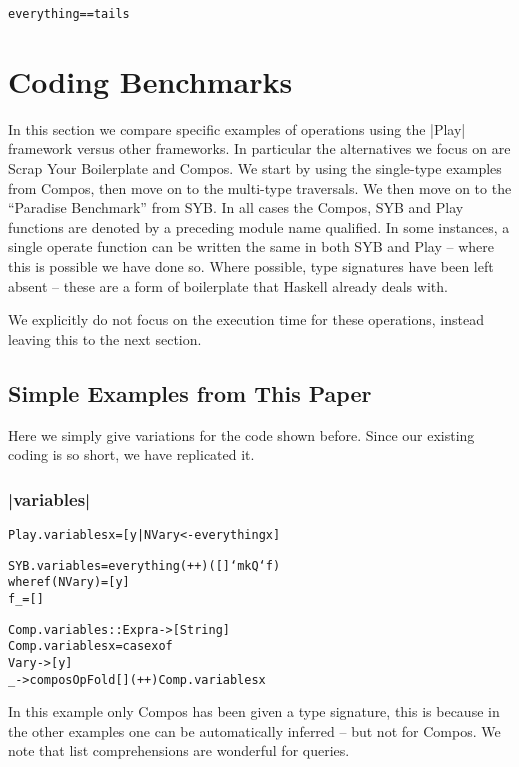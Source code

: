 \documentclass[preprint]{sigplanconf}
\newenvironment{code}{\begin{alltt}\small}{\end{alltt}}
\begin{document}
\begin{code}
everything == tails
\end{code}



\section{Coding Benchmarks}

In this section we compare specific examples of operations using the |Play| framework versus other frameworks. In particular the alternatives we focus on are Scrap Your Boilerplate and Compos. We start by using the single-type examples from Compos, then move on to the multi-type traversals. We then move on to the ``Paradise Benchmark'' from SYB. In all cases the Compos, SYB and Play functions are denoted by a preceding module name qualified. In some instances, a single operate function can be written the same in both SYB and Play -- where this is possible we have done so. Where possible, type signatures have been left absent -- these are a form of boilerplate that Haskell already deals with.

We explicitly do not focus on the execution time for these operations, instead leaving this to the next section.

\subsection{Simple Examples from This Paper}

Here we simply give variations for the code shown before. Since our existing coding is so short, we have replicated it.

\subsubsection{|variables|}

\begin{code}
Play.variables x = [y | NVar y <- everything x]

SYB.variables = everything (++) ([] `mkQ` f)
    where  f (NVar y)  = [y]
           f _         = []

Comp.variables :: Expr a -> [String]
Comp.variables x = case x of
    Var y -> [y]
    _ -> composOpFold [] (++) Comp.variables x
\end{code}

In this example only Compos has been given a type signature, this is because in the other examples one can be automatically inferred -- but not for Compos. We note that list comprehensions are wonderful for queries.
\end{document}

